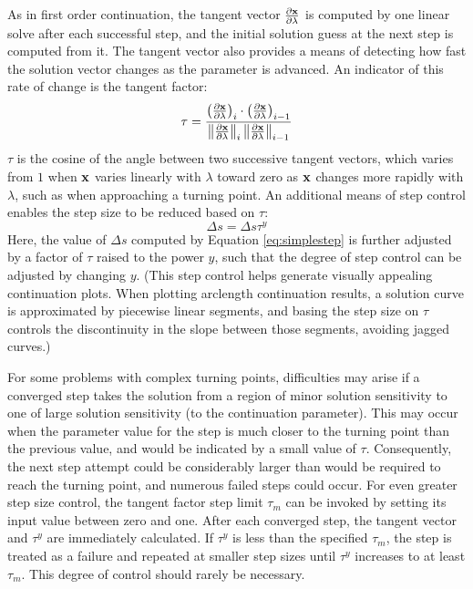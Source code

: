 As in first order continuation, the tangent vector $\frac{\partial {\bf x}}{\partial \lambda}$ is computed by one linear solve after each successful step, and the initial solution guess at the next step is computed from it. The tangent vector also provides a means of detecting how fast the solution vector changes as the parameter is advanced. An indicator of this rate of change is the tangent factor:
\begin{equation}
\label{eq:taud}
\tau = {{\left( \frac{\partial {\bf x}}{\partial \lambda} \right)_i \cdot \left( \frac{\partial {\bf x}}{\partial \lambda} \right)_{i-1}}\over {\left\| \frac{\partial  {\bf x}}{\partial \lambda} \right\|_i \left\| \frac{\partial  {\bf x}}{\partial \lambda} \right\|_{i-1}}}
\end{equation}
$\tau$ is the cosine of the angle between two successive tangent vectors, which varies from $1$ when ${\bf x}$ varies linearly with $\lambda$ toward zero as ${\bf x}$ changes more rapidly with $\lambda$, such as when approaching a turning point. An additional means of step control enables the step size to be reduced based on $\tau$:
\begin{equation}
\label{eq:tfact}
\Delta s = \Delta s \tau^y
\end{equation}
Here, the value of $\Delta s$ computed by Equation \ref{eq:simplestep} is further adjusted by a factor of $\tau$ raised to the power $y$, such that the degree of step control can be adjusted by changing $y$. (This step control helps generate visually appealing continuation plots. When plotting arclength continuation results, a solution curve is approximated by piecewise linear segments, and basing the step size on $\tau$ controls the discontinuity in the slope between those segments, avoiding jagged curves.)

For some problems with complex turning points, difficulties may arise if a converged step takes the solution from a region of minor solution sensitivity to one of large solution sensitivity (to the continuation parameter). This may occur when the parameter value for the step is much closer to the turning point than the previous value, and would be indicated by a small value of $\tau$. Consequently, the next step attempt could be considerably larger than would be required to reach the turning point, and numerous failed steps could occur. For even greater step size control, the tangent factor step limit $\tau_m$ can be invoked by setting its input value between zero and one. After each converged step, the tangent vector and $\tau^y$ are immediately calculated. If $\tau^y$ is less than the specified $\tau_m$, the step is treated as a failure and repeated at smaller step sizes until $\tau^y$ increases to at least $\tau_m$. This degree of control should rarely be necessary.

